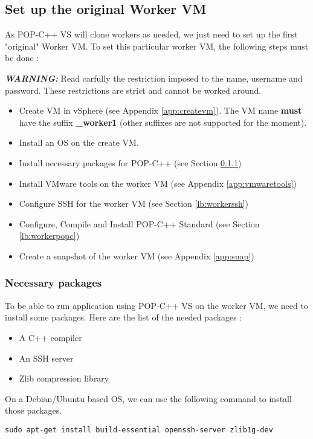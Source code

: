 \pagebreak
\subsection{Set up the original Worker VM}
\label{lb:workervm}
As POP-C++ VS will clone workers as needed, we just need to set up the first "original" Worker VM. To set this particular worker VM, the following steps must be done : 

\textbf{\textit{WARNING:}} Read carfully the restriction imposed to the name, username and password. These restrictions are strict and cannot be worked around. 
\begin{itemize}
\item Create VM in vSphere (see Appendix \ref{app:createvm}). The VM name \textbf{must} have the suffix \textbf{\_worker1} (other suffixes are not supported for the moment).
\item Install an OS on the create VM.
\item Install necessary packages for POP-C++ (see Section \ref{lb:workerpackages})
\item Install VMware tools on the worker VM (see Appendix \ref{app:vmwaretools})
\item Configure SSH for the worker VM (see Section \ref{lb:workerssh})
\item Configure, Compile and Install POP-C++ Standard (see Section \ref{lb:workerpopc})
\item Create a snapshot of the worker VM (see Appendix \ref{app:snap})
\end{itemize}


\subsubsection{Necessary packages}
\label{lb:workerpackages}
To be able to run application using POP-C++ VS on the worker VM, we need to install some packages. Here are the list of the needed packages : 

\begin{itemize}
\item A C++ compiler
\item An SSH server
\item Zlib compression library
\end{itemize}

On a Debian/Ubuntu based OS, we can use the following command to install those packages.\s

\begin{lstlisting}
sudo apt-get install build-essential openssh-server zlib1g-dev
\end{lstlisting}

